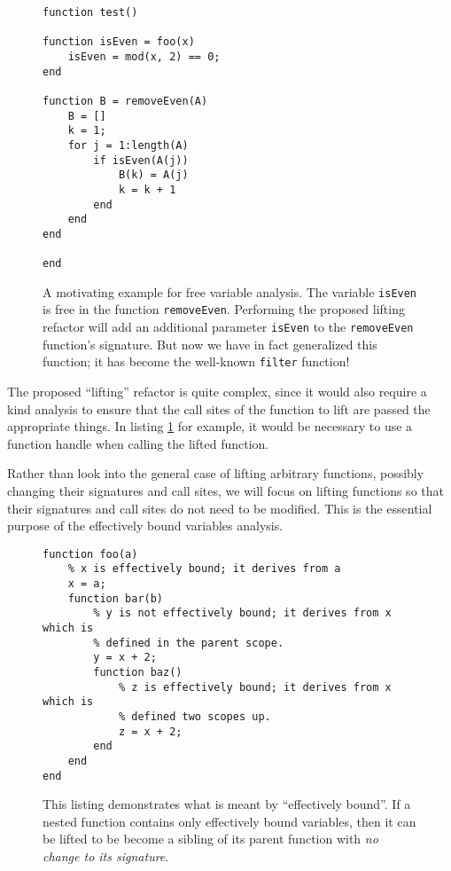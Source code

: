 \documentclass[letterpaper,11pt]{article}
\begin{document}
\begin{figure}[ht]
    \begin{lstlisting}
function test()

function isEven = foo(x)
    isEven = mod(x, 2) == 0;
end

function B = removeEven(A)
    B = []
    k = 1;
    for j = 1:length(A)
        if isEven(A(j))
            B(k) = A(j)
            k = k + 1
        end
    end
end

end
    \end{lstlisting}

    \caption{
        A motivating example for free variable analysis. The variable
        \texttt{isEven} is free in the function \texttt{removeEven}. Performing
        the proposed lifting refactor will add an additional parameter
        \texttt{isEven} to the \texttt{removeEven} function's signature. But
        now we have in fact generalized this function; it has become the
        well-known \texttt{filter} function!
    }
    \label{lst:motivation}
\end{figure}

The proposed ``lifting'' refactor is quite complex, since it would also require
a kind analysis to ensure that the call sites of the function to lift are
passed the appropriate things. In listing \ref{lst:motivation} for example, it
would be necessary to use a function handle when calling the lifted function.

Rather than look into the general case of lifting arbitrary functions, possibly
changing their signatures and call sites, we will focus on lifting functions so
that their signatures and call sites do not need to be modified. This is the
essential purpose of the effectively bound variables analysis.

\begin{figure}[ht]
    \begin{lstlisting}
function foo(a)
    % x is effectively bound; it derives from a
    x = a;
    function bar(b)
        % y is not effectively bound; it derives from x which is
        % defined in the parent scope.
        y = x + 2;
        function baz()
            % z is effectively bound; it derives from x which is
            % defined two scopes up.
            z = x + 2;
        end
    end
end
    \end{lstlisting}

    \caption{
        This listing demonstrates what is meant by ``effectively bound''. If a
        nested function contains only effectively bound variables, then it can
        be lifted to be become a sibling of its parent function with \emph{no
        change to its signature}.
    }
    \label{lst:effectively-bound}
\end{figure}
\end{document}
